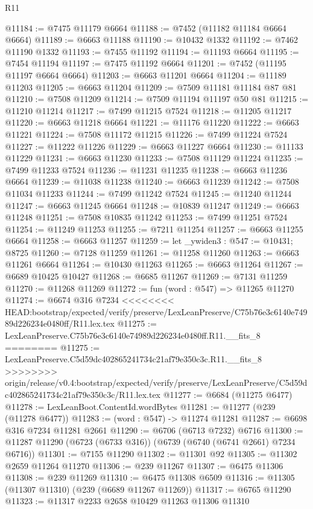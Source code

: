 \begin{lexlean}{R11}
\begin{coremodule}
{{{{{{{{{{{{{{{{{{{{{{{{{{{{{{{{{{{{{{{{{{{{{{{{{{{{{{{{{{{{{{{{{{{{{{{{{{{{{{{{{{@11184 := @7475 @11179 @6664
@11188 := @7452 (@11182 @11184 @6664 @6664)
@11189 := @6663 @11188
@11190 := @10432 @1332
@11192 := @7462 @11190 @1332
@11193 := @7455 @11192
@11194 := @11193 @6664
@11195 := @7454 @11194
@11197 := @7475 @11192 @6664
@11201 := @7452 (@11195 @11197 @6664 @6664)
@11203 := @6663 @11201 @6664
@11204 := @11189 @11203
@11205 := @6663 @11204
@11209 := @7509 @11181 @11184 @87 @81
@11210 := @7508 @11209
@11214 := @7509 @11194 @11197 @50 @81
@11215 := @11210 @11214
@11217 := @7499 @11215 @7524
@11218 := @11205 @11217
@11220 := @6663 @11218 @6664
@11221 := @11176 @11220
@11222 := @6663 @11221
@11224 := @7508 @11172 @11215
@11226 := @7499 @11224 @7524
@11227 := @11222 @11226
@11229 := @6663 @11227 @6664
@11230 := @11133 @11229
@11231 := @6663 @11230
@11233 := @7508 @11129 @11224
@11235 := @7499 @11233 @7524
@11236 := @11231 @11235
@11238 := @6663 @11236 @6664
@11239 := @11038 @11238
@11240 := @6663 @11239
@11242 := @7508 @11034 @11233
@11244 := @7499 @11242 @7524
@11245 := @11240 @11244
@11247 := @6663 @11245 @6664
@11248 := @10839 @11247
@11249 := @6663 @11248
@11251 := @7508 @10835 @11242
@11253 := @7499 @11251 @7524
@11254 := @11249 @11253
@11255 := @7211 @11254
@11257 := @6663 @11255 @6664
@11258 := @6663 @11257
@11259 := let _ywiden3 : @547 := @10431; @8725
@11260 := @7128 @11259
@11261 := @11258 @11260
@11263 := @6663 @11261 @6664
@11264 := @10430 @11263
@11265 := @6663 @11264
@11267 := @6689 @10425 @10427
@11268 := @6685 @11267
@11269 := @7131 @11259
@11270 := @11268 @11269
@11272 := fun (word : @547) => @11265 @11270
@11274 := @6674 @316 @7234
<<<<<<<< HEAD:bootstrap/expected/verify/preserve/LexLeanPreserve/C75b76e3c6140e74989d226234e0480ff/R11.lex.tex
@11275 := LexLeanPreserve.C75b76e3c6140e74989d226234e0480ff.R11.__fits_8
========
@11275 := LexLeanPreserve.C5d59dc402865241734c21af79e350c3c.R11.__fits_8
>>>>>>>> origin/release/v0.4:bootstrap/expected/verify/preserve/LexLeanPreserve/C5d59dc402865241734c21af79e350c3c/R11.lex.tex
@11277 := @6684 (@11275 @6477)
@11278 := LexLeanBoot.ContentId.wordBytes
@11281 := @11277 (@239 (@11278 @6477))
@11283 := (word : @547) -> @11274 @11281
@11287 := @6698 @316 @7234 @11281 @2661
@11290 := @6706 (@6713 @7232) @6716
@11300 := @11287 @11290 (@6723 (@6733 @316)) (@6739 (@6740 (@6741 @2661) @7234 @6716))
@11301 := @7155 @11290
@11302 := @11301 @92
@11305 := @11302 @2659 @11264 @11270
@11306 := @239 @11267
@11307 := @6475 @11306
@11308 := @239 @11269
@11310 := @6475 @11308 @6509
@11316 := @11305 (@11307 @11310) (@239 (@6689 @11267 @11269))
@11317 := @6765 @11290
@11323 := @11317 @2233 @2658 @10429 @11263 @11306 @11310
}}}}}}}}}}}}}}}}}}}}}}}}}}}}}}}}}}}}}}}}}}}}}}}}}}}}}}}}}}}}}}}}}}}}}}}}}}}}}}}}}}
\end{coremodule}
\end{lexlean}

